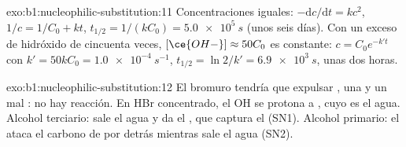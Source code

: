 \begin{solution}{exo:b1:nucleophilic-substitution:11}
Concentraciones iguales: $-\mathrm{d}c/\mathrm{d}t = kc^2$,
$1/c = 1/C_0 + kt$,
$t_{1/2} = 1/(kC_0) = \qty{5.0e5}{s}$ (unos seis días). Con un exceso de
hidróxido de cincuenta veces, $[\ce{OH-}] \approx 50C_0$ es constante: $c = C_0
e^{-k't}$ con $k' = 50kC_0 = \qty{1.0e-4}{s^{-1}}$, $t_{1/2} = \ln 2/k' =
\qty{6.9e3}{s}$, unas dos horas.
\end{solution}

\begin{solution}{exo:b1:nucleophilic-substitution:12}
El bromuro tendría que expulsar , una  y un mal : no hay reacción. En HBr concentrado, el OH se protona a
, cuyo  es el agua. Alcohol terciario: sale el
agua y da el , que captura el  (SN1). Alcohol
primario: el  ataca el carbono de  por detrás mientras
sale el agua (SN2).
\end{solution}

